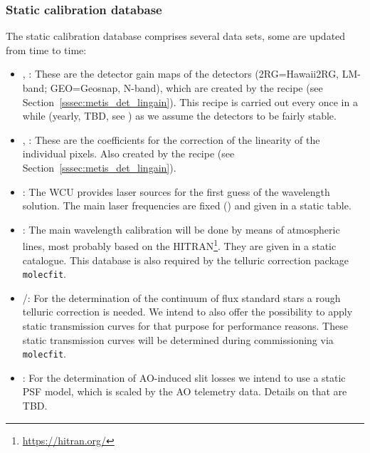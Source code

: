 \restoregeometry

\subsubsection{Static calibration database}\label{lss:static_calib}
The static calibration database comprises several data sets, some are updated from time to time:
\begin{itemize}
    \item \hyperref[dataitem:gain_map_2rg]{}, \hyperref[dataitem:gain_map_geo]{}: These are the detector gain maps of the detectors (2RG=Hawaii2RG, LM-band; GEO=Geosnap, N-band), which are created by the recipe \hyperref[sssec:metis_det_lingain]{} (see Section~\ref{sssec:metis_det_lingain}). This recipe is carried out every once in a while (yearly, TBD, see \cite{METIS-calibration_plan}) as we assume the detectors to be fairly stable.
    \item \hyperref[dataitem:linearity_det]{}, \hyperref[dataitem:linearity_det]{}: These are the coefficients for the correction of the linearity of the individual pixels. Also created by the recipe \hyperref[sssec:metis_det_lingain]{} (see Section~\ref{sssec:metis_det_lingain}). 
    \item \hyperref[dataitem:laser_tab]{}: The \ac{WCU} provides laser sources for the first guess of the wavelength solution. The main laser frequencies are fixed (\cite{METIS-calibration_plan}) and given in a static table.
    \item \hyperref[dataitem:atm_line_cat]{}: The main wavelength calibration will be done by means of atmospheric lines, most probably based on the \ac{HITRAN}\footnote{\url{https://hitran.org/}}. They are given in a static catalogue. This database is also required by the telluric correction package \texttt{molecfit}.
    \item \hyperref[dataitem:lm_synth_trans]{}/\hyperref[dataitem:n_synth_trans]{}: For the determination of the continuum of flux standard stars a rough telluric correction is needed. We intend to also offer the possibility to apply static transmission curves for that purpose for performance reasons. These static transmission curves will be determined during commissioning via \texttt{molecfit}.
    \item \hyperref[dataitem:ao_psf_model]{}: For the determination of \ac{AO}-induced slit losses we intend to use a static \ac{PSF} model, which is scaled by the \ac{AO} telemetry data. Details on that are TBD.

\end{itemize}
